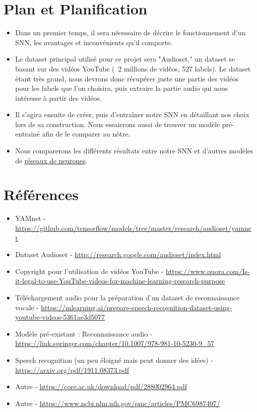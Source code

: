 \documentclass{article}
\begin{document}
\section{Plan et Planification}
\begin{itemize}
    \item Dans un premier temps, il sera nécessaire de décrire le fonctionnement d'un SNN, les avantages et inconvénients qu'il comporte.

    \item Le dataset principal utilisé pour ce projet sera "Audioset," un dataset se basant sur des vidéos YouTube (~2 millions de vidéos, 527 labels). Le dataset étant très grand, nous devrons donc récupérer juste une partie des vidéos pour les labels que l'on choisira, puis extraire la partie audio qui nous intéresse à partir des vidéos.

    \item Il s'agira ensuite de créer, puis d'entraîner notre SNN en détaillant nos choix lors de sa construction. Nous essaierons aussi de trouver un modèle pré-entrainé afin de le comparer au nôtre.

    \item Nous comparerons les différents résultats entre notre SNN et d'autres modèles de \href{https://pytorch.org/audio/stable/tutorials/speech_recognition_pipeline_tutorial.html}{réseaux de neurones}.
\end{itemize}

\section{Références}
\begin{itemize}
    \item YAMnet - \url{https://github.com/tensorflow/models/tree/master/research/audioset/yamnet}{}
    \item Dataset Audioset - \url{http://research.google.com/audioset/index.html}
    \item Copyright pour l'utilisation de vidéos YouTube - \url{https://www.quora.com/Is-it-legal-to-use-YouTube-videos-for-machine-learning-research-purpose}
    \item Téléchargement audio pour la préparation d'un dataset de reconnaissance vocale - \url{https://mlearning.ai/prepare-speech-recognition-dataset-using-youtube-videos-5361ae3d5077}
    \item Modèle pré-existant : Reconnaissance audio - \url{https://link.springer.com/chapter/10.1007/978-981-10-5230-9_57}
    \item Speech recognition (un peu éloigné mais peut donner des idées) - \url{https://arxiv.org/pdf/1911.08373.pdf}
    \item Autre - \url{https://core.ac.uk/download/pdf/288002964.pdf}
    \item Autre - \url{https://www.ncbi.nlm.nih.gov/pmc/articles/PMC6987407/}
\end{itemize}
\end{document}

